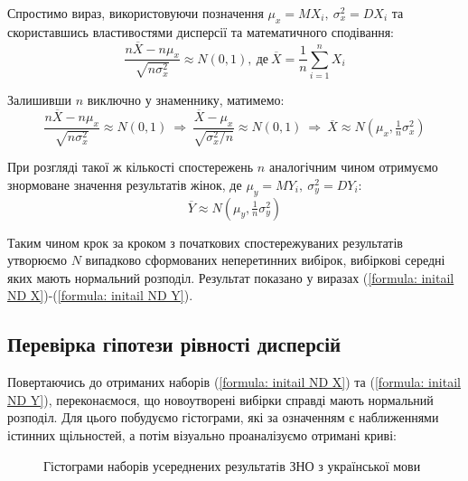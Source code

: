 Спростимо вираз, використовуючи позначення $\mu_x=MX_i,\ \sigma_x^2=DX_i$ та скориставшись властивостями 
дисперсії та математичного сподівання:
\begin{equation*}
    \frac{n\overline{X}-n\mu_x}{\sqrt{n\sigma_x^2}}\approx N(0,1),\ \text{де}\ \overline{X}=\frac{1}{n}\sum\limits_{i=1}^nX_i
\end{equation*}

Залишивши $n$ виключно у знаменнику, матимемо:
\begin{equation*}
    \frac{n\overline{X}-n\mu_x}{\sqrt{n\sigma_x^2}}\approx N(0,1)\ \Rightarrow\ 
    \frac{\overline{X}-\mu_x}{\sqrt{\sigma_x^2/n}}\approx N(0,1)\ \Rightarrow\
    \overline{X}\approx N(\mu_x,\tfrac{1}{n}\sigma_x^2)
\end{equation*}

При розгляді такої ж кількості спостережень $n$ аналогічним чином отримуємо знормоване значення 
результатів жінок, де $\mu_y=MY_i,\ \sigma_y^2=DY_i:$
\begin{equation*}
    \overline{Y}\approx N(\mu_y,\tfrac{1}{n}\sigma_y^2)
\end{equation*}

Таким чином крок за кроком з початкових спостережуваних результатів утворюємо $N$ випадково сформованих 
неперетинних вибірок, вибіркові середні яких мають нормальний розподіл. Результат показано у виразах 
(\ref{formula: initail ND X})-(\ref{formula: initail ND Y}).

\subsection{Перевірка гіпотези рівності дисперсій}

Повертаючись до отриманих наборів (\ref{formula: initail ND X}) та (\ref{formula: initail ND Y}), переконаємося, 
що новоутворені вибірки справді мають нормальний розподіл. Для цього побудуємо гістограми, які за означенням 
є наближеннями істинних щільностей, а потім візуально проаналізуємо отримані криві:

\begin{figure}[H]
    \caption{Гістограми наборів усереднених результатів ЗНО з української мови}
    \label{figure: UKR means data}
\end{figure}

